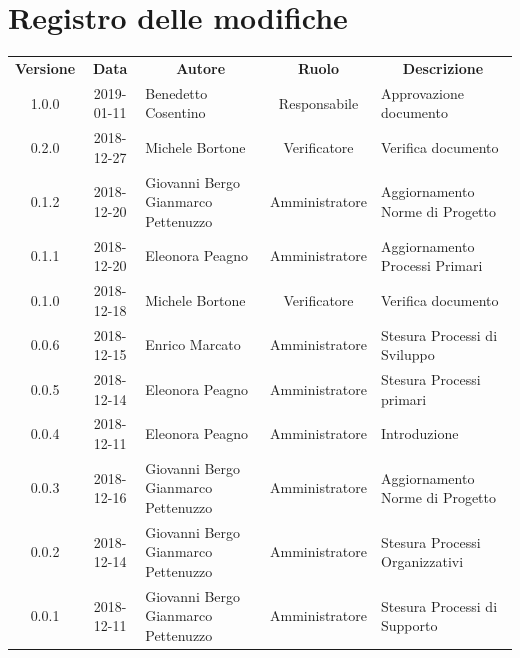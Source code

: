 \documentclass[11pt,a4paper]{article}
\begin{document}
	

	
	\newpage
	\section*{\centering Registro delle modifiche}
	\begin{tabularx}{\textwidth}{ c | c | X | c | X }
		\rowcolor{LightBlue}
		\color{white}\bfseries Versione & \color{white}\bfseries Data & \multicolumn{1}{c}{\color{white}\bfseries Autore}
		 & \color{white}\bfseries Ruolo & \multicolumn{1}{c}{\color{white}\bfseries Descrizione}\\[0.25cm]
		 1.0.0 & 2019-01-11 & Benedetto Cosentino & Responsabile & Approvazione documento \\ \hline
		 0.2.0 & 2018-12-27 & Michele Bortone & Verificatore & Verifica documento \\ \hline
		0.1.2 & 2018-12-20 & Giovanni Bergo \newline Gianmarco Pettenuzzo & Amministratore & Aggiornamento Norme di Progetto \\ \hline
		0.1.1 & 2018-12-20 & Eleonora Peagno & Amministratore & Aggiornamento Processi Primari \\ \hline
		0.1.0 & 2018-12-18 & Michele Bortone & Verificatore & Verifica documento \\ \hline
		0.0.6 & 2018-12-15 & Enrico Marcato & Amministratore & Stesura Processi di \newline Sviluppo \\ \hline
		0.0.5 & 2018-12-14 & Eleonora Peagno & Amministratore & Stesura Processi primari \\ \hline
		0.0.4 & 2018-12-11 & Eleonora Peagno & Amministratore & Introduzione \\ \hline
	0.0.3 & 2018-12-16 & Giovanni Bergo \newline Gianmarco Pettenuzzo & Amministratore & Aggiornamento Norme di Progetto \\ \hline
	0.0.2 & 2018-12-14 & Giovanni Bergo \newline Gianmarco Pettenuzzo & Amministratore & Stesura Processi \newline Organizzativi \\ \hline
	0.0.1 & 2018-12-11 & Giovanni Bergo \newline Gianmarco Pettenuzzo & Amministratore & Stesura Processi di \newline Supporto \\ \hline


	
		
	
	\end{tabularx}
\end{document}
